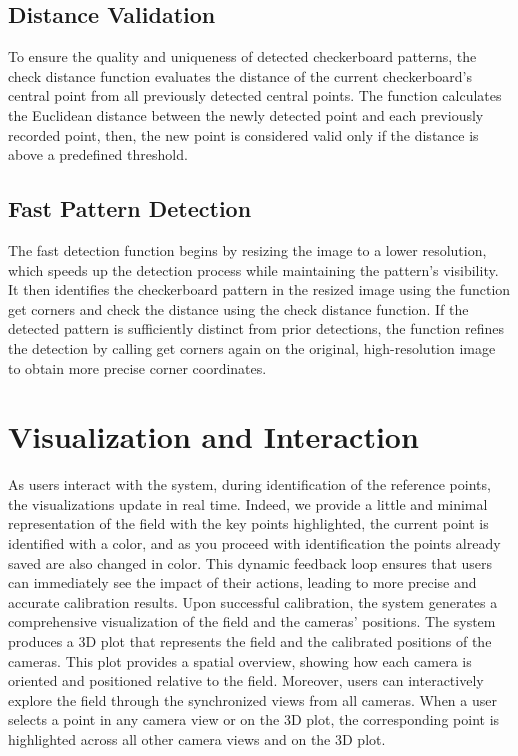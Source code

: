 \documentclass{template}
\begin{document}
\subsection{Distance Validation}
To ensure the quality and uniqueness of detected checkerboard patterns, the check distance function evaluates the distance of the current checkerboard's central point from all previously detected central points. 
The function calculates the Euclidean distance between the newly detected point and each previously recorded point, then, the new point is considered valid only if the distance is above a predefined threshold.

\subsection{Fast Pattern Detection}
The fast detection function begins by resizing the image to a lower resolution, which speeds up the detection process while maintaining the pattern’s visibility. 
It then identifies the checkerboard pattern in the resized image using the function get corners and check the distance using the check distance function.
If the detected pattern is sufficiently distinct from prior detections, the function refines the detection by calling get corners again on the original, high-resolution image to obtain more precise corner coordinates. 

\section{Visualization and Interaction}
As users interact with the system, during identification of the reference points, the visualizations update in real time. 
Indeed, we provide a little and minimal representation of the field with the key points highlighted, the current point is identified with a color, and as you proceed with identification the points already saved are also changed in color. 
This dynamic feedback loop ensures that users can immediately see the impact of their actions, leading to more precise and accurate calibration results.
Upon successful calibration, the system generates a comprehensive visualization of the field and the cameras' positions. The system produces a 3D plot that represents the field and the calibrated positions of the cameras. 
This plot provides a spatial overview, showing how each camera is oriented and positioned relative to the field.
Moreover, users can interactively explore the field through the synchronized views from all cameras. When a user selects a point in any camera view or on the 3D plot, the corresponding point is highlighted across all other camera views and on the 3D plot. 
\end{document}
